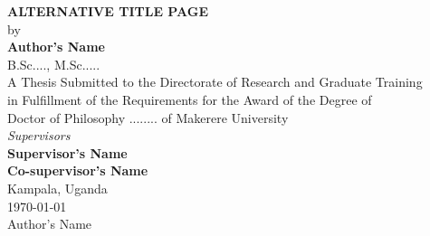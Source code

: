 \begin{titlepage}
    \centering
    {\MakeUppercase{ \Large \textbf{Alternative Title Page}}}\\[2cm] %

    {by}\\[1cm]
    {\textbf{\large Author's Name}\\[0.1cm]
    B.Sc...., M.Sc.....}\\[2cm] %
    A Thesis Submitted to the Directorate of Research and Graduate Training\\in Fulfillment of the Requirements for the Award of the Degree of \\Doctor of Philosophy ........ of Makerere University\\[2cm]
    
    \emph{\large Supervisors}\\[0.5cm]
    \textbf{Supervisor's Name} \\[0.5cm]
    \textbf{Co-supervisor's Name}\\[2cm]
    
    {\large Kampala, Uganda}\\[0.5cm] %
    {\today}\\[0.5cm] %

    \vfill %
    {\textcopyright{}  Author's Name \the\year}
\end{titlepage}
